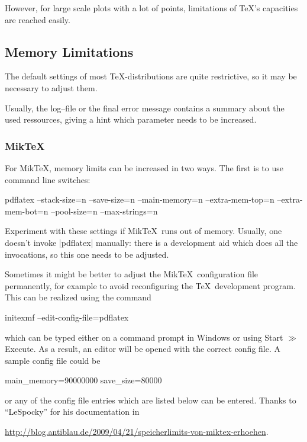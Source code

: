 However, for large scale plots with a lot of points, limitations of \TeX's capacities are reached easily.

\subsection{Memory Limitations}
The default settings of most \TeX-distributions are quite restrictive, so it may be necessary to adjust them. 

Usually, the log--file or the final error message contains a summary about the used ressources, giving a hint which parameter needs to be increased.

\subsubsection{Mik\TeX}
For Mik\TeX, memory limits can be increased in two ways. The first is to use command line switches:
\begin{codeexample}
pdflatex 
	--stack-size=n --save-size=n 
	--main-memory=n --extra-mem-top=n --extra-mem-bot=n
	--pool-size=n --max-strings=n 
\end{codeexample}
\noindent Experiment with these settings if Mik\TeX\ runs out of memory. Usually, one doesn't invoke |pdflatex| manually: there is a development aid which does all the invocations, so this one needs to be adjusted. 

Sometimes it might be better to adjust the Mik\TeX\ configuration file permanently, for example to avoid reconfiguring the \TeX\ development program. This can be realized using the command
\begin{codeexample}
initexmf --edit-config-file=pdflatex
\end{codeexample}
\noindent which can be typed either on a command prompt in Windows or using Start $\gg$ Execute. As a result, an editor will be opened with the correct config file. A sample config file could be
\begin{codeexample}
main_memory=90000000
save_size=80000
\end{codeexample}
or any of the config file entries which are listed below can be entered. 
Thanks to ``LeSpocky'' for his documentation in

\url{http://blog.antiblau.de/2009/04/21/speicherlimits-von-miktex-erhoehen}.

